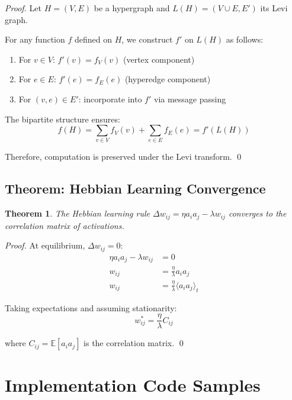 \documentclass[12pt,a4paper,openany]{book} %
\newtheorem{theorem}{Theorem}[chapter]
\begin{document}
\begin{proof}
Let $H = (V, E)$ be a hypergraph and $L(H) = (V \cup E, E')$ its Levi graph.

For any function $f$ defined on $H$, we construct $f'$ on $L(H)$ as follows:
\begin{enumerate}
    \item For $v \in V$: $f'(v) = f_V(v)$ (vertex component)
    \item For $e \in E$: $f'(e) = f_E(e)$ (hyperedge component)
    \item For $(v,e) \in E'$: incorporate into $f'$ via message passing
\end{enumerate}

The bipartite structure ensures:
\begin{equation}
f(H) = \sum_{v \in V} f_V(v) + \sum_{e \in E} f_E(e) = f'(L(H))
\end{equation}

Therefore, computation is preserved under the Levi transform. \qed
\end{proof}

\section{Theorem: Hebbian Learning Convergence}

\begin{theorem}
The Hebbian learning rule $\Delta w_{ij} = \eta a_i a_j - \lambda w_{ij}$ converges to the correlation matrix of activations.
\end{theorem}

\begin{proof}
At equilibrium, $\Delta w_{ij} = 0$:
\begin{align}
\eta a_i a_j - \lambda w_{ij} &= 0\\
w_{ij} &= \frac{\eta}{\lambda} a_i a_j\\
w_{ij} &= \frac{\eta}{\lambda} \langle a_i a_j \rangle_t
\end{align}

Taking expectations and assuming stationarity:
\begin{equation}
w_{ij}^* = \frac{\eta}{\lambda} C_{ij}
\end{equation}

where $C_{ij} = \mathbb{E}[a_i a_j]$ is the correlation matrix. \qed
\end{proof}

\chapter{Implementation Code Samples}
\end{document}
